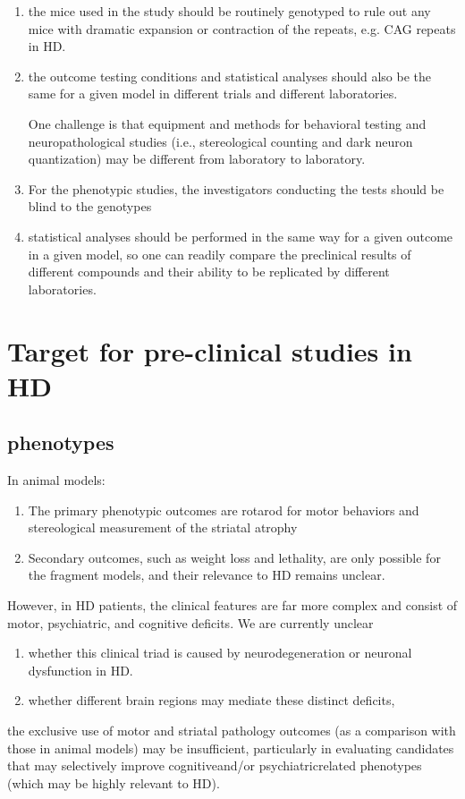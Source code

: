 \begin{enumerate}
   \item the mice used in the study should be routinely genotyped to rule out
   any mice with dramatic expansion or contraction of the repeats, e.g. CAG
   repeats in HD. 

   \item the outcome testing conditions and statistical analyses should also be
   the same for a given model in different trials and different laboratories.

One challenge is that equipment and methods for behavioral testing and neuropathological
studies (i.e., stereological counting and dark neuron quantization) may be
different from laboratory to laboratory. 
  
   \item For the phenotypic studies, the investigators conducting the tests
  should be blind to the genotypes
  
   \item statistical analyses should be performed in the same way for a given
   outcome in a given model, so one can readily compare the preclinical results
   of different compounds and their ability to be replicated by different
   laboratories.
\end{enumerate}

\section{Target for pre-clinical studies in HD}

\subsection{phenotypes}

In animal models:
\begin{enumerate}
  \item  The primary phenotypic outcomes are rotarod for motor behaviors and
stereological measurement of the striatal atrophy

  \item Secondary outcomes, such as weight loss and lethality, are only
possible for the fragment models, and their relevance to HD remains unclear.
\end{enumerate}

However, in HD patients, the clinical features are far more complex and consist
of motor, psychiatric, and cognitive deficits. We are currently unclear 
\begin{enumerate}
  
  \item  whether this clinical triad is caused by neurodegeneration or neuronal
  dysfunction in HD.

  \item whether different brain regions may mediate these distinct deficits,
\end{enumerate}
the exclusive use of motor and striatal pathology outcomes (as a comparison
with those in animal models) may be insufficient, particularly in evaluating
candidates that may selectively improve cognitiveand/or psychiatricrelated
phenotypes (which may be highly relevant to HD).

